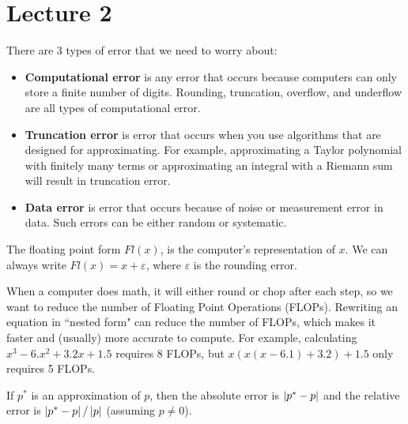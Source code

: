 \documentclass{article}
\begin{document}
\section{Lecture 2}
There are 3 types of error that we need to worry about:
\begin{itemize}
    \item \textbf{Computational error} is any error that occurs because computers can only store a finite number of digits. Rounding, truncation, overflow, and underflow are all types of computational error.
    \item \textbf{Truncation error} is error that occurs when you use algorithms that are designed for approximating. For example, approximating a Taylor polynomial with finitely many terms or approximating an integral with a Riemann sum will result in truncation error.
    \item \textbf{Data error} is error that occurs because of noise or measurement error in data. Such errors can be either random or systematic.
\end{itemize}
The floating point form $Fl(x)$, is the computer's representation of $x$. We can always write $Fl(x) = x + \varepsilon$, where $\varepsilon$ is the rounding error.
\par
When a computer does math, it will either round or chop after each step, so we want to reduce the number of Floating Point Operations (FLOPs). Rewriting an equation in ``nested form" can reduce the number of FLOPs, which makes it faster and (usually) more accurate to compute. For example, calculating $x^3-6.x^2+3.2x+1.5$ requires 8 FLOPs, but $x(x(x-6.1)+3.2)+1.5$ only requires 5 FLOPs.
\par
If $p^*$ is an approximation of $p$, then the absolute error is $\left\lvert p^*-p \right\rvert$ and the relative error is $\left\lvert p^*-p \right\rvert/\left\lvert p \right\rvert$ (assuming $p \neq 0$).
\end{document}
